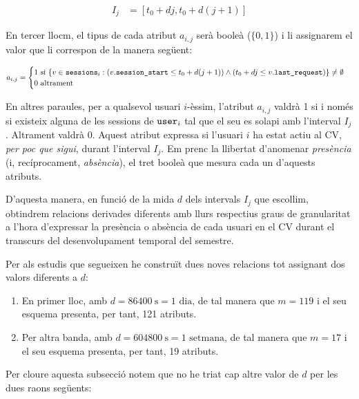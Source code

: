 \documentclass[
	a4paper,
	twoside,
	justified
]{tufte-book}
\begin{document}
\begin{align*}
	I_j & = [t_0 + dj, t_0 + d(j+1)] 
\end{align*}

En tercer llocm, el tipus de cada atribut $a_{i,j}$ serà booleà ($\{0,1\}$) i li assignarem el valor que li correspon de la manera següent:

$$
	a_{i,j} = \begin{cases}
					1 \text{ si } \{v \in \texttt{sessions}_i : (v.\texttt{session\_start} \leq t_0 + d(j+1)) \wedge (t_0 + dj \leq v.\texttt{last\_request})  \} \neq \emptyset   \\
					0 \text{ altrament}
					\end{cases} 
$$

En altres paraules, per a qualsevol usuari $i$-èssim, l'atribut $a_{i,j}$ valdrà 1 si i només si existeix alguna de les sessions de $\texttt{user}_i$ tal que el seu  es solapi amb l'interval $I_j$. Altrament valdrà 0. Aquest atribut expressa si l'usuari $i$ ha estat actiu al CV, \emph{per poc que sigui}, durant l'interval $I_j$. Em prenc la llibertat d'anomenar \emph{presència} (i, recíprocament, \emph{absència}), el tret booleà que mesura cada un d'aquests atributs. 

D'aquesta manera, en funció de la mida $d$ dels intervals $I_j$ que escollim, obtindrem relacions derivades diferents amb llurs respectius graus de granularitat a l'hora d'expressar la presència o absència de cada usuari en el CV durant el transcurs del desenvolupament temporal del semestre.

Per als estudis que segueixen he construït dues noves relacions tot assignant dos valors diferents a $d$:

\begin{enumerate}[(1)]

\item En primer lloc,  amb $d=\SI{86400}{\second} = 1\text{ dia}$, de tal manera que $m = 119$ i el seu esquema presenta, per tant, 121 atributs.

\item Per altra banda,   amb $d=\SI{604800}{\second} = 1\text{ setmana}$, de tal manera que $m = 17$ i el seu esquema presenta, per tant, 19 atributs. 
\end{enumerate}

Per cloure aquesta subsecció notem que no he triat cap altre valor de $d$ per les dues raons següents:
\end{document}
